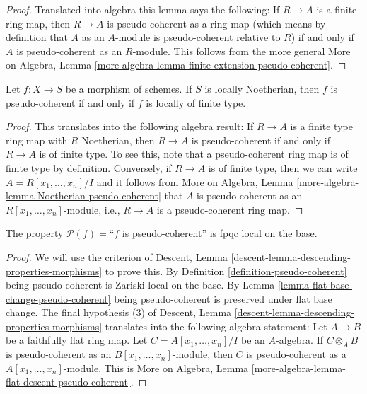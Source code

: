 \begin{proof}
Translated into algebra this lemma says the following: If $R \to A$
is a finite ring map, then $R \to A$ is pseudo-coherent as a ring map
(which means by definition that $A$ as an $A$-module is
pseudo-coherent relative to $R$) if and only if
$A$ is pseudo-coherent as an $R$-module. This follows from
the more general
More on Algebra, Lemma
\ref{more-algebra-lemma-finite-extension-pseudo-coherent}.
\end{proof}

\begin{lemma}
\label{lemma-Noetherian-pseudo-coherent}
Let $f : X \to S$ be a morphism of schemes.
If $S$ is locally Noetherian, then $f$ is pseudo-coherent if
and only if $f$ is locally of finite type.
\end{lemma}

\begin{proof}
This translates into the following algebra result:
If $R \to A$ is a finite type ring map with $R$ Noetherian, then
$R \to A$ is pseudo-coherent if and only if $R \to A$ is of finite type.
To see this, note that a pseudo-coherent ring map is of finite type by
definition. Conversely, if $R \to A$ is of finite type, then
we can write $A = R[x_1, \ldots, x_n]/I$ and it follows from
More on Algebra,
Lemma \ref{more-algebra-lemma-Noetherian-pseudo-coherent}
that $A$ is pseudo-coherent as an $R[x_1, \ldots, x_n]$-module, i.e.,
$R \to A$ is a pseudo-coherent ring map.
\end{proof}

\begin{lemma}
\label{lemma-descending-property-pseudo-coherent}
The property $\mathcal{P}(f) =$``$f$ is pseudo-coherent''
is fpqc local on the base.
\end{lemma}

\begin{proof}
We will use the criterion of
Descent, Lemma \ref{descent-lemma-descending-properties-morphisms}
to prove this. By
Definition \ref{definition-pseudo-coherent}
being pseudo-coherent is Zariski local on the base. By
Lemma \ref{lemma-flat-base-change-pseudo-coherent}
being pseudo-coherent is preserved under flat base change.
The final hypothesis (3) of
Descent, Lemma \ref{descent-lemma-descending-properties-morphisms}
translates into the following algebra statement:
Let $A \to B$ be a faithfully flat ring map.
Let $C = A[x_1, \ldots, x_n]/I$ be an $A$-algebra.
If $C \otimes_A B$ is pseudo-coherent as an $B[x_1, \ldots, x_n]$-module,
then $C$ is pseudo-coherent as a $A[x_1, \ldots, x_n]$-module.
This is
More on Algebra, Lemma \ref{more-algebra-lemma-flat-descent-pseudo-coherent}.
\end{proof}

